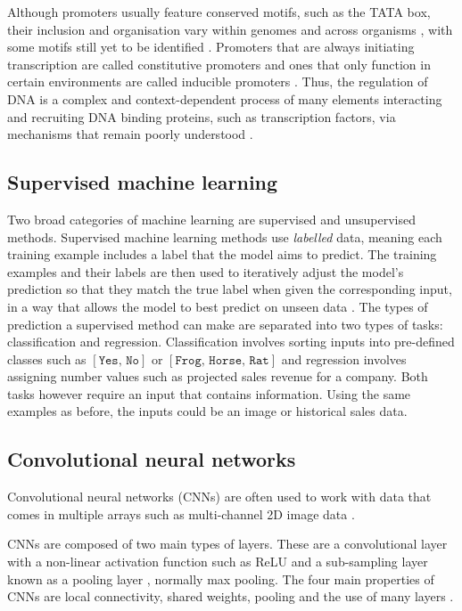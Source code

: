 \documentclass{article}
\begin{document}
Although promoters usually feature conserved motifs, such as the TATA box, their inclusion and organisation vary within genomes and across organisms \cite{kadonaga2012coreprom}, with some motifs still yet to be identified \cite{yang2007tatabox}. Promoters that are always initiating transcription are called constitutive promoters and ones that only function in certain environments are called inducible promoters \cite{smolke2020promoter}. Thus, the regulation of DNA is a complex and context-dependent process of many elements interacting and recruiting DNA binding proteins, such as transcription factors, via mechanisms that remain poorly understood \cite{yang2007tatabox, Smale2003}.  

\subsection{Supervised machine learning}
Two broad categories of machine learning are supervised and unsupervised methods. Supervised machine learning methods use \textit{labelled} data, meaning each training example includes a label that the model aims to predict. The training examples and their labels are then used to iteratively adjust the model's prediction so that they match the true label when given the corresponding input, in a way that allows the model to best predict on unseen data \cite{LeCun2015}. The types of prediction a supervised method can make are separated into two types of tasks: classification and regression. Classification involves sorting inputs into pre-defined classes such as $[\texttt{Yes, No}]$ or $[\texttt{Frog, Horse, Rat}]$ and regression involves assigning number values such as projected sales revenue for a company. Both tasks however require an input that contains information. Using the same examples as before, the inputs could be an image or historical sales data.

\subsection{Convolutional neural networks}
Convolutional neural networks (CNNs) are often used to work with data that comes in multiple arrays such as multi-channel 2D image data \cite{LeCun2015}.  

CNNs are composed of two main types of layers. These are a convolutional layer with a non-linear activation function such as ReLU and a sub-sampling layer known as a pooling layer \cite{LeCun2015,FERREIRA2018205}, normally max pooling. The four main properties of CNNs are local connectivity, shared weights, pooling and the use of many layers \cite{LeCun2015}.
\end{document}
